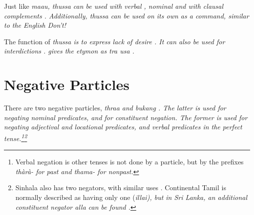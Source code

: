 


Just like \em maau, thussa \em can be used with verbal , nominal  and with clausal complements . Additionally, \em thussa \em can be used on its own as a command, similar to the English \em Don't!\em






%


%


The function of \em thussa \em is to express lack of desire . It can also be used for interdictions .
\citet{Adelaar1991} gives the etymon as \em *tra usa \em \citep[also see][60]{Saldin2001}.

\section{Negative Particles}\label{sec:wc:NegativeParticles}
There are two negative particles, \em thraa \em {} and \em bukang \em {}. The latter is used for negating nominal predicates, and for constituent negation. The former is used for negating adjectival and locational predicates, and verbal predicates in the perfect tense.\footnote{Verbal negation is other tenses is not done by a particle, but by the prefixes \em thàrà- \em {} for past and \em thama- \em {} for nonpast.}\footnote{Sinhala also has two negators, with similar uses \citep{GairEtAl1988argstr}. Continental Tamil is normally described as having only one (\em illai\em), but in Sri Lanka, an additional constituent negator \em alla \em can be found \citep{GairEtAl1981jaffnaverb}.}


